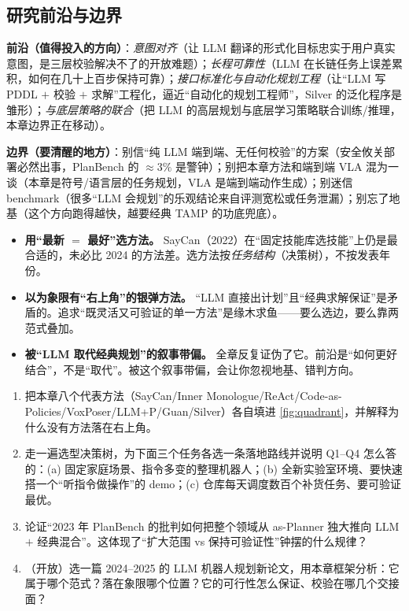 \subsection{研究前沿与边界}
\label{sec:map-frontier}

\textbf{前沿（值得投入的方向）}：\emph{意图对齐}（让 LLM 翻译的形式化目标忠实于用户真实意图，是三层校验解决不了的开放难题）；\emph{长程可靠性}（LLM 在长链任务上误差累积，如何在几十上百步保持可靠）；\emph{接口标准化与自动化规划工程}（让“LLM 写 PDDL $+$ 校验 $+$ 求解”工程化，逼近“自动化的规划工程师”，Silver 的泛化程序是雏形）；\emph{与底层策略的联合}（把 LLM 的高层规划与底层学习策略联合训练/推理，本章边界正在移动）。

\textbf{边界（要清醒的地方）}：别信“纯 LLM 端到端、无任何校验”的方案（安全攸关部署必然出事，PlanBench 的 $\approx 3\%$ 是警钟）；别把本章方法和端到端 VLA 混为一谈（本章是符号/语言层的任务规划，VLA 是端到端动作生成）；别迷信 benchmark（很多“LLM 会规划”的乐观结论来自评测宽松或任务泄漏）；别忘了地基（这个方向跑得越快，越要经典 TAMP 的功底兜底）。

\begin{pitfall}[本节常见陷阱]
\begin{itemize}
  \item \textbf{用“最新 $=$ 最好”选方法。} SayCan（2022）在“固定技能库选技能”上仍是最合适的，未必比 2024 的方法差。选方法按\emph{任务结构}（决策树），不按发表年份。
  \item \textbf{以为象限有“右上角”的银弹方法。} “LLM 直接出计划”且“经典求解保证”是矛盾的。追求“既灵活又可验证的单一方法”是缘木求鱼——要么选边，要么靠两范式叠加。
  \item \textbf{被“LLM 取代经典规划”的叙事带偏。} 全章反复证伪了它。前沿是“如何更好结合”，不是“取代”。被这个叙事带偏，会让你忽视地基、错判方向。
\end{itemize}
\end{pitfall}

\begin{exercise}
\begin{enumerate}
  \item 把本章八个代表方法（SayCan/Inner Monologue/ReAct/Code-as-Policies/VoxPoser/LLM+P/Guan/Silver）各自填进 \cref{fig:quadrant}，并解释为什么没有方法落在右上角。
  \item 走一遍选型决策树，为下面三个任务各选一条落地路线并说明 Q1--Q4 怎么答的：(a) 固定家庭场景、指令多变的整理机器人；(b) 全新实验室环境、要快速搭一个“听指令做操作”的 demo；(c) 仓库每天调度数百个补货任务、要可验证最优。
  \item 论证“2023 年 PlanBench 的批判如何把整个领域从 as-Planner 独大推向 LLM $+$ 经典混合”。这体现了“扩大范围 vs 保持可验证性”钟摆的什么规律？
  \item （开放）选一篇 2024--2025 的 LLM 机器人规划新论文，用本章框架分析：它属于哪个范式？落在象限哪个位置？它的可行性怎么保证、校验在哪几个交接面？
\end{enumerate}
\end{exercise}

